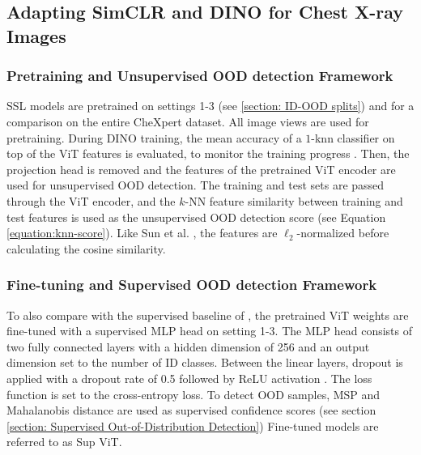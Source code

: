 \subsection{Adapting SimCLR and DINO for Chest X-ray Images}
\label{section: adapted-methods}
\subsubsection{Pretraining and Unsupervised OOD detection Framework}
SSL models are pretrained on settings 1-3 (see \ref{section: ID-OOD splits}) and for a comparison on the entire CheXpert dataset.
All image views are used for pretraining.
During  DINO training, the mean accuracy of a $1$-knn classifier on top of the ViT features is evaluated, to monitor the training progress \citep{Wu2018,Caron2021}.
Then, the projection head is removed \citep{Caron2021,Chen2020} and the features of the pretrained ViT encoder are used for unsupervised OOD detection.
The training and test sets are passed through the ViT encoder, and the $k$-NN feature similarity between training and test features is used as the unsupervised OOD detection score (see Equation \ref{equation:knn-score}).
Like Sun et al. \citep{Sun2022}, the features are $\ell_2$-normalized before calculating the cosine similarity.
\par
\subsubsection{Fine-tuning and Supervised OOD detection Framework}
To also compare with the supervised baseline of \citep{Berger2021}, the pretrained ViT weights are fine-tuned with a supervised MLP head on setting 1-3.
The MLP head consists of two fully connected layers with a hidden dimension of 256 and an output dimension set to the number of ID classes.
Between the linear layers, dropout is applied with a dropout rate of 0.5 \citep{Srivastava2014} followed by ReLU activation \citep{Agarap2018}.
The loss function is set to the cross-entropy loss. 
To detect OOD samples, MSP and Mahalanobis distance are used as supervised confidence scores (see section \ref{section: Supervised Out-of-Distribution Detection})
Fine-tuned models are referred to as Sup ViT.
\par
